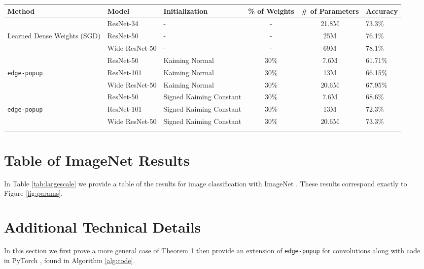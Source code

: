 \documentclass[10pt,twocolumn,letterpaper]{article}
\newcommand{\alg}{\texttt{edge-popup} }
\begin{document}
\appendix
\begin{table*}[ht!]
  \small
  \centering
  \begin{tabular}{lllccl}
    \toprule
    Method & Model & Initialization & \% of Weights & \# of Parameters & Accuracy\\
    \midrule
    & ResNet-34 \cite{resnet} & - & - & 21.8M & 73.3\% \\
    Learned Dense Weights (SGD) & ResNet-50 \cite{resnet}& - & - & 25M & 76.1\%\\
    & Wide ResNet-50 \cite{wideresnet} & - & - & 69M & 78.1\%\\
    \midrule
    & ResNet-50 & Kaiming Normal & 30\% & 7.6M & 61.71\%\\
    \alg & ResNet-101 & Kaiming Normal & 30\% & 13M & 66.15\%\\
    & Wide ResNet-50 & Kaiming Normal & 30\% & 20.6M & 67.95\%\\
    \midrule
    & ResNet-50 & Signed Kaiming Constant & 30\% & 7.6M & 68.6\%\\
    \alg & ResNet-101 & Signed Kaiming Constant & 30\% & 13M & 72.3\%\\
    & Wide ResNet-50 & Signed Kaiming Constant & 30\% & 20.6M & 73.3\%\\
    \bottomrule
        \\
    \end{tabular}
    \caption{ImageNet \cite{imagenet} classification results corresponding to Figure \ref{fig:params}. Note that for the non-dense models, \# of Parameters denotes the size of the subnetwork.}
\label{tab:largescale}
\end{table*} 

\section{Table of ImageNet Results} \label{sec:imtable}

In Table \ref{tab:largescale} we provide a table of the results for image classification with ImageNet \cite{imagenet}. These results correspond exactly to Figure \ref{fig:params}.

\section{Additional Technical Details} \label{sec:technical-details}

In this section we first prove a more general case of Theorem 1 then provide an extension of \alg for convolutions along with code in PyTorch \cite{pytorch}, found in Algorithm \ref{alg:code}.
\end{document}
